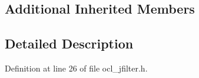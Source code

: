 \subsection*{Additional Inherited Members}


\subsection{Detailed Description}


Definition at line 26 of file ocl\+\_\+jfilter.\+h.

